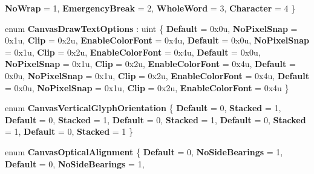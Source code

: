 \begin{DoxyCompactItemize}
{\bfseries No\+Wrap} = 1, 
{\bfseries Emergency\+Break} = 2, 
{\bfseries Whole\+Word} = 3, 
\newline
{\bfseries Character} = 4
 \}
\item 
\mbox{\label{namespace_microsoft_1_1_graphics_1_1_canvas_1_1_text_a186331309945bc8dcbfe364bc6f55fdb}} 
enum {\bfseries Canvas\+Draw\+Text\+Options} \+: uint \{ \newline
{\bfseries Default} = 0x0u, 
{\bfseries No\+Pixel\+Snap} = 0x1u, 
{\bfseries Clip} = 0x2u, 
{\bfseries Enable\+Color\+Font} = 0x4u, 
\newline
{\bfseries Default} = 0x0u, 
{\bfseries No\+Pixel\+Snap} = 0x1u, 
{\bfseries Clip} = 0x2u, 
{\bfseries Enable\+Color\+Font} = 0x4u, 
\newline
{\bfseries Default} = 0x0u, 
{\bfseries No\+Pixel\+Snap} = 0x1u, 
{\bfseries Clip} = 0x2u, 
{\bfseries Enable\+Color\+Font} = 0x4u, 
\newline
{\bfseries Default} = 0x0u, 
{\bfseries No\+Pixel\+Snap} = 0x1u, 
{\bfseries Clip} = 0x2u, 
{\bfseries Enable\+Color\+Font} = 0x4u, 
\newline
{\bfseries Default} = 0x0u, 
{\bfseries No\+Pixel\+Snap} = 0x1u, 
{\bfseries Clip} = 0x2u, 
{\bfseries Enable\+Color\+Font} = 0x4u
 \}
\item 
\mbox{\label{namespace_microsoft_1_1_graphics_1_1_canvas_1_1_text_ac948f04f716279fad132d07892e44d18}} 
enum {\bfseries Canvas\+Vertical\+Glyph\+Orientation} \{ \newline
{\bfseries Default} = 0, 
{\bfseries Stacked} = 1, 
{\bfseries Default} = 0, 
{\bfseries Stacked} = 1, 
\newline
{\bfseries Default} = 0, 
{\bfseries Stacked} = 1, 
{\bfseries Default} = 0, 
{\bfseries Stacked} = 1, 
\newline
{\bfseries Default} = 0, 
{\bfseries Stacked} = 1
 \}
\item 
\mbox{\label{namespace_microsoft_1_1_graphics_1_1_canvas_1_1_text_aa1f89365afa2b2891e65edc60ec74cdd}} 
enum {\bfseries Canvas\+Optical\+Alignment} \{ \newline
{\bfseries Default} = 0, 
{\bfseries No\+Side\+Bearings} = 1, 
{\bfseries Default} = 0, 
{\bfseries No\+Side\+Bearings} = 1, 
\newline

\end{DoxyCompactItemize}

